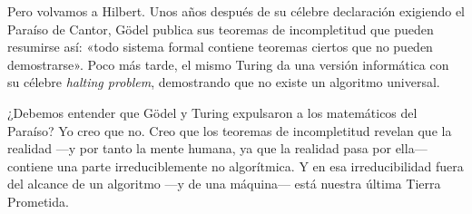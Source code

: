 \documentclass[11pt,a4paper]{article}
\begin{document}
%
%
%
Pero volvamos a Hilbert. Unos años después de su célebre declaración exigiendo el Paraíso de Cantor, Gödel publica sus teoremas de incompletitud que pueden resumirse así: «todo sistema formal contiene teoremas ciertos que no pueden demostrarse». Poco más tarde, el mismo Turing da una versión informática con su célebre \emph{halting problem}, demostrando que no existe un algoritmo universal.

¿Debemos entender que Gödel y Turing expulsaron a los matemáticos del Paraíso? Yo creo que no. Creo que los teoremas de incompletitud revelan que la realidad ---y por tanto la mente humana, ya que la realidad pasa por ella--- contiene una parte irreduciblemente no algorítmica. Y en esa irreducibilidad fuera del alcance de un algoritmo ---y de una máquina--- está nuestra última Tierra Prometida.

\end{document}
